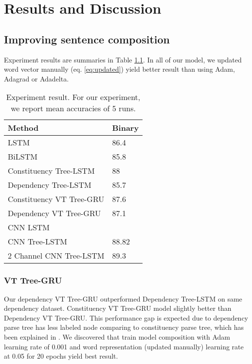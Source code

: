 \chapter{Results and Discussion}


\section{Improving sentence composition}
Experiment results are summaries in Table \ref{table:experimentresult}. In all of our model, we updated word vector manually (eq. \ref{eq:updated}) yield better result than using Adam, Adagrad or Adadelta. 

\begin{table}[H]
	\centering
	\caption{Experiment result. For our experiment, we report mean accuracies of 5 runs.}
	\label{table:experimentresult}
	\begin{tabular}{ll}
		Method                                   & Binary \\ \hline
		LSTM                                     & 86.4   \\
		BiLSTM                                   & 85.8   \\ \hline
		Constituency Tree-LSTM \cite{treeLSTM} & 88     \\
		Dependency Tree-LSTM  \cite{treeLSTM}  & 85.7   \\ \hline
		Constituency VT Tree-GRU                 & 87.6   \\
		Dependency VT Tree-GRU                   & 87.1   \\ \hline
		CNN LSTM								&         \\
		CNN Tree-LSTM                            & 88.82  \\
		2 Channel CNN Tree-LSTM  				& 89.3 
	\end{tabular}
\end{table}

\subsection{VT Tree-GRU}
Our dependency VT Tree-GRU outperformed Dependency Tree-LSTM on same dependency dataset. Constituency VT Tree-GRU model slightly better than Dependency VT Tree-GRU. This performance gap is expected due to dependency parse tree has less labeled node comparing to constituency parse tree, which has been explained in \cite{treeLSTM}. We discovered that train model composition with Adam learning rate of 0.001 and word representation (updated manually) learning rate at 0.05 for 20 epochs yield best result.


